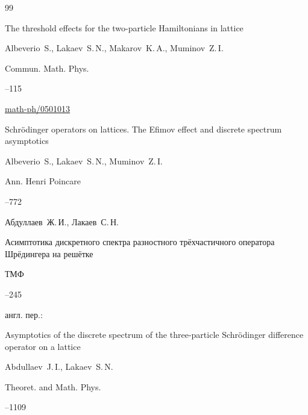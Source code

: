 \begin{thebibliography}{99}




\paper The threshold effects for the two-particle Hamiltonians in lattice

\by Albeverio~S., Lakaev~S.\,N., Makarov~K.\,A., Muminov~Z.\,I.

\jour Commun. Math. Phys.




--115

\arxiv \href{http://arxiv.org/abs/math-ph/0501013}{math-ph/0501013}




\paper Schr\"{o}dinger operators on lattices. The Efimov effect and discrete spectrum asymptotics

\by Albeverio~S., Lakaev~S.\,N., Muminov~Z.\,I.

\jour Ann. Henri Poincare




--772




\by Абдуллаев~Ж.\,И., Лакаев~С.\,Н.

\paper Асимптотика дискретного спектра разностного трёхчастичного оператора Шрёдингера на решётке

\jour ТМФ




--245

\transl англ. пер.:~

\paper Asymptotics of the discrete spectrum of the three-particle Schr\"{o}dinger difference operator on a lattice

\by Abdullaev~J.\,I., Lakaev~S.\,N.

\jour Theoret. and Math. Phys.




--1109






\end{thebibliography}
